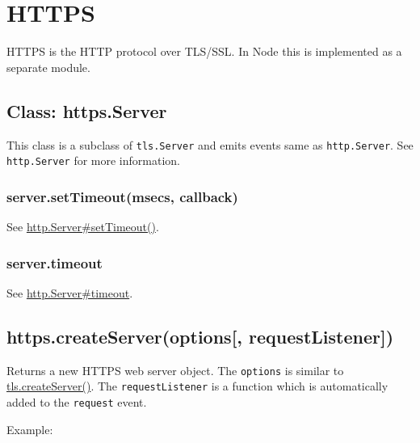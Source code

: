 \section{HTTPS}\label{https}

\begin{Shaded}
\begin{Highlighting}[]
 
\end{Highlighting}
\end{Shaded}

HTTPS is the HTTP protocol over TLS/SSL. In Node this is implemented as
a separate module.

\subsection{Class: https.Server}\label{class-https.server}

This class is a subclass of \texttt{tls.Server} and emits events same as
\texttt{http.Server}. See \texttt{http.Server} for more information.

\subsubsection{server.setTimeout(msecs,
callback)}\label{server.settimeoutmsecs-callback}

See
\href{http.html\#http_server_settimeout_msecs_callback}{http.Server\#setTimeout()}.

\subsubsection{server.timeout}\label{server.timeout}

See \href{http.html\#http_server_timeout}{http.Server\#timeout}.

\subsection{https.createServer(options{[},
requestListener{]})}\label{https.createserveroptions-requestlistener}

Returns a new HTTPS web server object. The \texttt{options} is similar
to
\href{tls.html\#tls_tls_createserver_options_secureconnectionlistener}{tls.createServer()}.
The \texttt{requestListener} is a function which is automatically added
to the \texttt{\textquotesingle{}request\textquotesingle{}} event.

Example:

